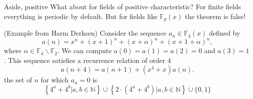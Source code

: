 \documentclass[notheorems]{beamer}
\theoremstyle{plain}
\newcommand{\FF}{\mathbb F}
\begin{document}
\begin{frame}{Aside, positive }
    What about for fields of positive characteristic?
    \pause
    For finite fields everything is periodic by default.
    \pause
    But for fields like $\FF_p(x)$ the theorem is false!
    \pause

    (Example from Harm Derksen) Consider the sequence $a_n \in \mathbb{F}_4(x)$ defined by
    $$
    a(n)=x^n+(x+1)^n+(x+\alpha)^n+(x+1+\alpha)^n,
    $$
    where $\alpha \in \mathbb{F}_4 \backslash \mathbb{F}_2$. We can compute $a(0)=a(1)=a(2)=0$ and $a(3)=1$. This sequence satisfies a recurrence relation of order 4
    $$
    a(n+4)=a(n+1)+\left(x^4+x\right) a(n) .
    $$
    the set of $n$ for which $a_n = 0$ is
    \[
        \left\{4^a+4^b | a, b \in \mathbb{N}\right\} \cup\left\{2 \cdot\left(4^a+4^b\right) | a, b \in \mathbb{N}\right\} \cup\{0,1\}
    \]
\end{frame}
\end{document}
